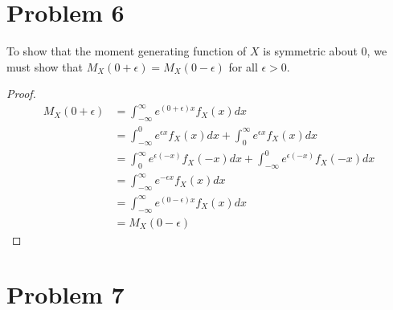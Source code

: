 \documentclass[11pt]{article}
\begin{document}
\section*{Problem 6}

To show that the moment generating function of $X$ is symmetric about 0, we must show that $M_X(0 + \epsilon) = M_X(0 - \epsilon)$ for all $\epsilon > 0$.

\begin{proof}

\begin{align*}
  M_X(0 + \epsilon) &= \int_{-\infty}^{\infty} e^{(0+\epsilon)x}f_X(x) dx \\
  &= \int_{-\infty}^0 e^{\epsilon x} f_X(x) dx + \int_0^{\infty} e^{\epsilon x} f_X(x) dx \\
  &= \int_0^{\infty} e^{\epsilon (-x)} f_X(-x) dx + \int_{-\infty}^0 e^{\epsilon (-x)} f_X(-x) dx \\
  &= \int_{-\infty}^{\infty} e^{-\epsilon x} f_X(x) dx \\
  &= \int_{-\infty}^{\infty} e^{(0-\epsilon)x} f_X(x) dx \\
  &= M_X(0-\epsilon)
\end{align*}

\end{proof}

\section*{Problem 7}
\end{document}
